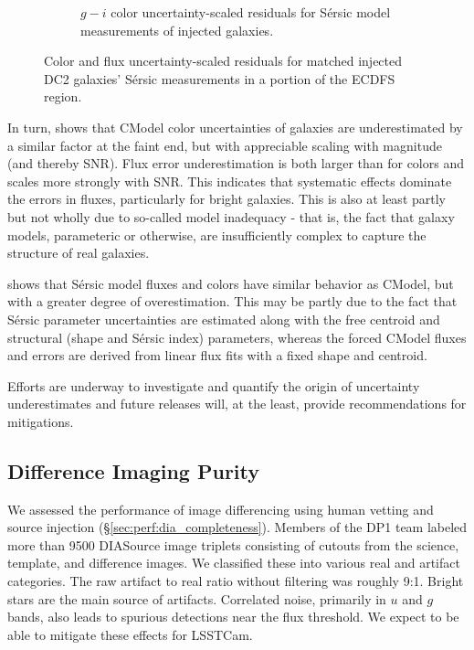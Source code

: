 \begin{figure}[hbt!]
\begin{subfigure}[t]{0.45\textwidth}
  \caption{$g-i$ color uncertainty-scaled residuals for S\'ersic model measurements of injected galaxies.}
  \end{subfigure}\hfill
\caption{Color and flux uncertainty-scaled residuals for matched injected DC2 galaxies' S\'ersic measurements in a portion of the \gls{ECDFS} region.}
\label{fig:injected_lsst_cells_v1_5063_galaxy_sersic_chi}
\end{figure}

In turn,  shows that CModel color uncertainties of galaxies are underestimated by a similar factor at the faint end, but with appreciable scaling with magnitude (and thereby \gls{SNR}).
Flux error underestimation is both larger than for colors and scales more strongly with \gls{SNR}.
This indicates that systematic effects dominate the errors in fluxes, particularly for bright galaxies.
This is also at least partly but not wholly due to so-called model inadequacy - that is, the fact that galaxy models, parameteric or otherwise, are insufficiently complex to capture the structure of real galaxies.

 shows that S\'ersic model fluxes and colors have similar behavior as CModel, but with a greater degree of overestimation.
This may be partly due to the fact that S\'ersic parameter uncertainties are estimated along with the free centroid and structural (shape and S\'ersic index) parameters, whereas the forced CModel fluxes and errors are derived from linear flux fits with a fixed shape and centroid.

Efforts are underway to investigate and quantify the origin of uncertainty underestimates and future releases will, at the least, provide recommendations for mitigations.

\subsection{Difference Imaging Purity} 
\label{sec:performance:dia}

We assessed the performance of image differencing using human vetting and source injection (\S \ref{sec:perf:dia_completeness}).
Members of the \gls{DP1} team labeled more than 9500 DIASource image triplets consisting of cutouts from the science, template, and difference images.
We classified these into various real and artifact categories.
The raw artifact to real ratio without filtering was roughly 9:1.
Bright stars are the main source of artifacts.
Correlated noise, primarily in $u$ and $g$ bands, also leads to spurious detections near the flux threshold.
We expect to be able to mitigate these effects for \gls{LSSTCam}.

